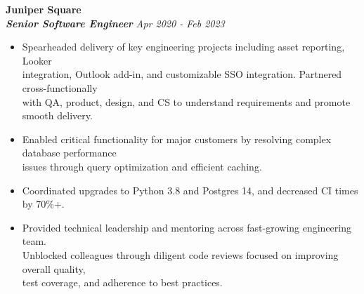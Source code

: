 \documentclass[]{resume}
\newcommand\tab[1][.5cm]{\hspace*{#1}}
\begin{document}
\begin{resume}
\vspace{0.9mm}
\textbf{\large Juniper Square}\\
\tab \textbf{\textit{Senior Software Engineer}} \hfill \textit{Apr 2020 - Feb 2023}
\begin{itemize}
    \item
    Spearheaded delivery of key engineering projects including asset reporting, Looker \\
    integration, Outlook add-in, and customizable SSO integration. Partnered cross-functionally \\
    with QA, product, design, and CS to understand requirements and promote smooth delivery.
    \item
    Enabled critical functionality for major customers by resolving complex database performance \\
    issues through query optimization and efficient caching.
    \item
    Coordinated upgrades to Python 3.8 and Postgres 14, and decreased CI times by 70\%+.
    \item
    Provided technical leadership and mentoring across fast-growing engineering team. \\
    Unblocked colleagues through diligent code reviews focused on improving overall quality, \\
    test coverage, and adherence to best practices.
\end{itemize}


\end{resume}
\end{document}
